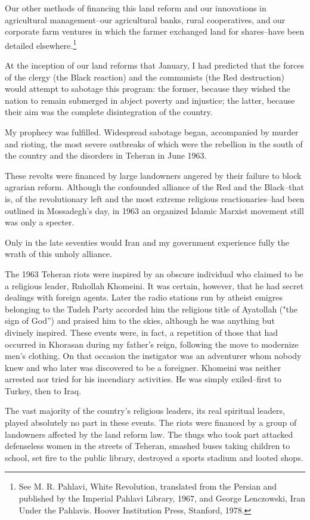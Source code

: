 Our other methods of financing this land reform and our innovations in agricultural management--our agricultural banks, rural cooperatives, and our corporate farm ventures in which the farmer exchanged land for shares--have been detailed elsewhere.\footnote{See M. R. Pahlavi, White Revolution, translated from the Persian and published by the Imperial Pahlavi Library, 1967, and George Lenczowski, Iran Under the Pahlavis. Hoover Institution Press, Stanford, 1978.}

At the inception of our land reforms that January, I had predicted that the forces of the clergy (the Black reaction) and the communists (the Red destruction) would attempt to sabotage this program: the former, because they wished the nation to remain submerged in abject poverty and injustice; the latter, because their aim was the complete disintegration of the country. 

My prophecy was fulfilled. Widespread sabotage began, accompanied by murder and rioting, the most severe outbreaks of which were the rebellion in the south of the country and the disorders in Teheran in June 1963. 

These revolts were financed by large landowners angered by their failure to block agrarian reform. Although the confounded alliance of the Red and the Black--that is, of the revolutionary left and the most extreme religious reactionaries--had been outlined in Mossadegh's day, in 1963 an organized Islamic Marxist movement still was only a specter.


Only in the late seventies would Iran and my government experience fully the wrath of this unholy alliance. 

The 1963 Teheran riots were inspired by an obscure individual who claimed to be a religious leader, Ruhollah Khomeini. It was certain, however, that he had secret dealings with foreign agents. Later the radio stations run by atheist emigres belonging to the Tudeh Party accorded him the religious title of Ayatollah ("the sign of God”) and praised him to the skies, although he was anything but divinely inspired. These events were, in fact, a repetition of those that had occurred in Khorasan during my father’s reign, following the move to modernize men’s clothing. On that occasion the instigator was an adventurer whom nobody knew and who later was discovered to be a foreigner. Khomeini was neither arrested nor tried for his incendiary activities. He was simply exiled--first to Turkey, then to Iraq. 

The vast majority of the country's religious leaders, its real spiritual leaders, played absolutely no part in these events. The riots were financed by a group of landowners affected by the land reform law. The thugs who took part attacked defenseless women in the streets of Teheran, smashed buses taking children to school, set fire to the public library, destroyed a sports stadium and looted shops. 

